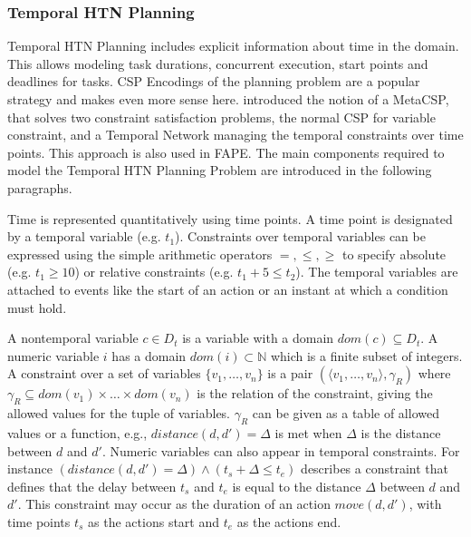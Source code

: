 \subsubsection{Temporal HTN Planning}\label{sec:temporal-htn-planning}

Temporal HTN Planning includes explicit information about time in the domain.
This allows modeling task durations, concurrent execution, start points and deadlines for tasks.
CSP Encodings of the planning problem are a popular strategy and makes even more sense here.
\cite{stockHierarchicalHybridPlanning2015} introduced the notion of a MetaCSP, that solves two constraint satisfaction problems, the normal CSP for variable constraint, and a Temporal Network managing the temporal constraints over time points.
This approach is also used in FAPE.
The main components required to model the Temporal HTN Planning Problem are introduced in the following paragraphs. 


Time is represented quantitatively using time points. %
A time point is designated by a temporal variable (e.g. $t_1$).
Constraints over temporal variables can be expressed using the simple arithmetic operators $=,\leq,\geq$ to specify absolute  (e.g. $t_1 \geq 10$) or relative constraints (e.g. $t_1 + 5 \leq t_2$).
The temporal variables are attached to events like the start of an action or an instant at which a condition must hold.

A nontemporal variable $c \in D_t$ is a variable with a domain $dom(c) \subseteq D_t$.
A numeric variable $i$ has a domain $dom(i) \subset \mathbb{N}$ which is a finite subset of integers.
A constraint over a set of variables $\{v_1,\dots ,v_n \}$ is a pair $(\langle v_1, \dots, v_n \rangle, \gamma_R)$ where $\gamma_R \subseteq dom(v_1) \times \dots \times dom(v_n)$ is the relation of the constraint, giving the allowed values for the tuple of variables.
$\gamma_R$ can be given as a table of allowed values or a function, e.g., $\textit{distance}(d, d') = \Delta$ is met when $\Delta$ is the distance between $d$ and $d'$.
Numeric variables can also appear in temporal constraints.
For instance $(\textit{distance}(d, d') = \Delta) \land (t_s + \Delta \leq t_e)$ describes a constraint that defines that the delay between $t_s$ and $t_e$ is equal to the distance $\Delta$ between $d$ and $d'$.
This constraint may occur as the duration of an action $move(d,d')$, with time points $t_s$ as the actions start and $t_e$ as the actions end.

